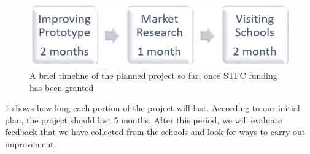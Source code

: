 \begin{center}
\begin{figure}[htb]
    \centering
    \includegraphics{education/STFCproposal/ProjectTime.png}
    \caption{A brief timeline of the planned project so far, once STFC funding has been granted}
    \label{fig:PropTimeline_STFC}
\end{figure} 
\end{center}

\ref{fig:PropTimeline_STFC} shows how long each portion of the project will last. According to our initial plan, the project should last 5 months. After this period, we will evaluate feedback that we have collected from the schools and look for ways to carry out improvement.

